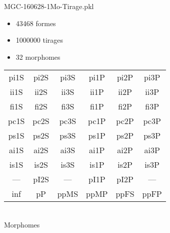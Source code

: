 MGC-160628-1Mo-Tirage.pkl
\begin{itemize}
\item 43468 formes
\item 1000000 tirages
\item 32 morphomes
\end{itemize}
\begin{center}
\begin{tabular}{cccccc}
\hline
\cellcolor{white}pi1S & \cellcolor{orange}pi2S & \cellcolor{orange}pi3S & \cellcolor{white}pi1P & \cellcolor{white}pi2P & \cellcolor{white}pi3P\\
\cellcolor{brown}ii1S & \cellcolor{brown}ii2S & \cellcolor{brown}ii3S & \cellcolor{white}ii1P & \cellcolor{white}ii2P & \cellcolor{brown}ii3P\\
\cellcolor{yellow}fi1S & \cellcolor{lime}fi2S & \cellcolor{lime}fi3S & \cellcolor{green}fi1P & \cellcolor{white}fi2P & \cellcolor{green}fi3P\\
\cellcolor{yellow}pc1S & \cellcolor{yellow}pc2S & \cellcolor{yellow}pc3S & \cellcolor{white}pc1P & \cellcolor{white}pc2P & \cellcolor{yellow}pc3P\\
\cellcolor{teal}ps1S & \cellcolor{teal}ps2S & \cellcolor{teal}ps3S & \cellcolor{white}ps1P & \cellcolor{white}ps2P & \cellcolor{teal}ps3P\\
\cellcolor{white}ai1S & \cellcolor{lightgray}ai2S & \cellcolor{lightgray}ai3S & \cellcolor{white}ai1P & \cellcolor{white}ai2P & \cellcolor{white}ai3P\\
\cellcolor{pink}is1S & \cellcolor{pink}is2S & \cellcolor{lightgray}is3S & \cellcolor{white}is1P & \cellcolor{white}is2P & \cellcolor{pink}is3P\\
--- & \cellcolor{white}pI2S & --- & \cellcolor{white}pI1P & \cellcolor{white}pI2P & ---\\
\cellcolor{white}inf & \cellcolor{white}pP & \cellcolor{cyan}ppMS & \cellcolor{cyan}ppMP & \cellcolor{magenta}ppFS & \cellcolor{magenta}ppFP\\
\hline
\end{tabular}\\
Morphomes
\end{center}
\bigskip
